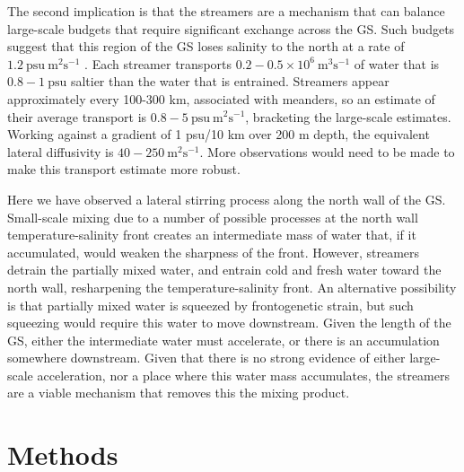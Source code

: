 \documentclass{natureJMK}
\begin{document}
The second implication is that the streamers are a mechanism that can balance large-scale budgets that require significant exchange across the GS\cite{joyceetal13,boweretal85}. Such budgets suggest that this region of the GS loses salinity to the north at a rate of $1.2\ \mathrm{psu\  m^2 s^{-1}}$ \cite{joyceetal13}.  Each streamer transports $0.2-0.5 \times 10^6\ \mathrm{m^3 s^{-1}}$ of water that is $0.8-1\ \mathrm{psu}$ saltier than the water that is entrained.  Streamers appear approximately every 100-300 km, associated with meanders, so an estimate of their average transport is $0.8-5\ \mathrm{psu\ m^2s^{-1}}$, bracketing the large-scale estimates.  Working against a gradient of 1 psu/10 km over 200 m depth, the equivalent lateral diffusivity is $40-250\ \mathrm{m^2s^{-1}}$. More observations would need to be made to make this transport estimate more robust.

Here we have observed a lateral stirring process along the north wall of the GS.  Small-scale mixing due to a number of possible processes\cite{thomasshakespeare15,whittthomas13} at the north wall temperature-salinity front creates an intermediate mass of water that, if it accumulated, would weaken the sharpness of the front. However,  streamers detrain the partially mixed water, and entrain cold and fresh water toward the north wall, resharpening  the temperature-salinity front.  An alternative possibility is that partially mixed water is squeezed by frontogenetic strain, but such squeezing would require  this water to move downstream.  Given the length of the GS, either the intermediate water must accelerate, or  there is an accumulation somewhere downstream. Given that there is no strong evidence of either large-scale  acceleration, nor a place where this water mass accumulates, the streamers are a viable mechanism that removes this the mixing product.  


\section{Methods}
\end{document}
